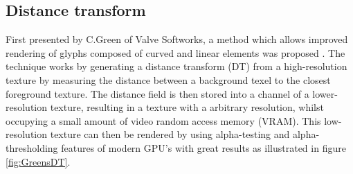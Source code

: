 \subsection{Distance transform}
First presented by C.Green of Valve Softworks, a method which allows improved rendering of glyphs composed of curved and linear elements was proposed \cite{green2007improved}. The technique works by generating a distance transform (DT) from a high-resolution texture by measuring the distance between a background texel to the closest foreground texture. The distance field is then stored into a channel of a lower-resolution texture, resulting in a texture with a arbitrary resolution, whilst occupying a small amount of video random access memory (VRAM). This low-resolution texture can then be rendered by using alpha-testing and alpha-thresholding features of modern GPU's with great results as illustrated in figure \ref{fig:GreensDT}. 

